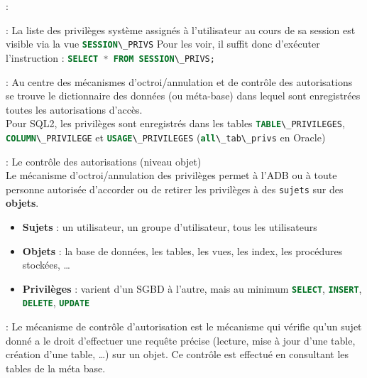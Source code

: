 \documentclass[10pt]{beamer}
\begin{document}
\begin{frame}{\secname : \subsecname}
    
\end{frame}

\begin{frame}{\secname : \subsecname}
    La liste des privilèges système assignés à l'utilisateur au cours de sa session est visible via la vue \lstinline[language=sql]!SESSION\_PRIVS!
    Pour les voir, il suffit donc d'exécuter l'instruction :
    \lstinline[language=sql]!SELECT * FROM SESSION\_PRIVS;!
\end{frame}
\begin{frame}{\secname : \subsecname}
    Au centre des mécanismes d'octroi/annulation et de contrôle des autorisations se trouve le dictionnaire des données (ou méta-base) dans lequel sont enregistrées toutes les autorisations d'accès.\\
    Pour SQL2, les privilèges sont enregistrés dans les tables
    \lstinline[language=sql]!TABLE\_PRIVILEGES!, \lstinline[language=sql]!COLUMN\_PRIVILEGE! et \lstinline[language=sql]!USAGE\_PRIVILEGES! (\lstinline[language=sql]!all\_tab\_privs! en Oracle)
\end{frame}

\begin{frame}{\secname : \subsecname}
    Le contrôle des autorisations (niveau objet)\\
    Le mécanisme d'octroi/annulation des privilèges permet à l'ADB ou à toute personne autorisée d'accorder ou de retirer les privilèges à des \lstinline[language=sql]!sujets! sur des \textbf{objets}.
    \begin{itemize}
        \item \textbf{Sujets} : un utilisateur, un groupe d'utilisateur, tous les utilisateurs
        \item \textbf{Objets} : la base de données, les tables, les vues, les index, les procédures stockées, …
        \item \textbf{Privilèges} : varient d'un SGBD à l'autre, mais au minimum \lstinline[language=sql]!SELECT!, \lstinline[language=sql]!INSERT!, \lstinline[language=sql]!DELETE!, \lstinline[language=sql]!UPDATE!
    \end{itemize}
\end{frame}

\begin{frame}{\secname : \subsecname}
    Le mécanisme de contrôle d'autorisation est le mécanisme qui vérifie qu'un sujet donné a le droit d'effectuer une requête précise (lecture, mise à jour d'une table, création d'une table, …) sur un objet.  Ce contrôle est effectué en consultant les tables de la méta base.
\end{frame}
\end{document}
